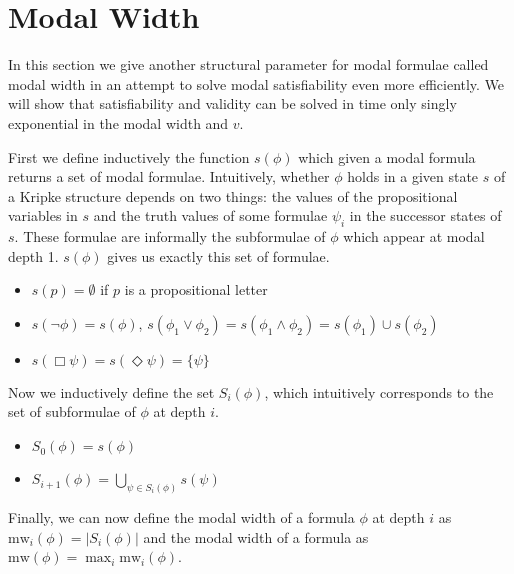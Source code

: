 \documentclass{llncs}
\begin{document}
\newcommand{\mw}{\textrm{mw}}

\section{Modal Width} \label{sec:width}

In this section we give another structural parameter for modal
formulae called modal width in an attempt to solve modal
satisfiability even more efficiently. We will show that
satisfiability and validity can be solved in time only singly
exponential in the modal width and $v$.

First we define inductively the function $s(\phi)$ which given a modal formula
returns a set of modal formulae. Intuitively, whether $\phi$ holds in a given
state $s$ of a Kripke structure depends on two things: the values of the
propositional variables in $s$ and the truth values of some formulae $\psi_i$
in the successor states of $s$. These formulae are informally the subformulae
of $\phi$ which appear at modal depth 1. $s(\phi)$ gives us exactly this set of
formulae.

\begin{itemize}

\item $s(p)=\emptyset$ if $p$ is a propositional letter

\item $s(\neg \phi)=s(\phi)$, $s(\phi_1\lor \phi_2)=s(\phi_1\land
\phi_2) = s(\phi_1) \cup s(\phi_2)$

\item $s(\Box \psi) = s(\Diamond \psi) = \{ \psi \}$

\end{itemize}

Now we inductively define the set $S_i(\phi)$, which intuitively corresponds to
the set of subformulae of $\phi$ at depth $i$.

\begin{itemize}

\item $S_0(\phi) = s(\phi)$

\item $S_{i+1}(\phi) = \bigcup_{\psi\in S_i(\phi)} s(\psi)$

\end{itemize}

Finally, we can now define the modal width of a formula $\phi$ at depth $i$ as
$\mw_i(\phi)=|S_i(\phi)|$ and the modal width of a formula as
$\mw(\phi)=\max_i\mw_i(\phi)$.
\end{document}
